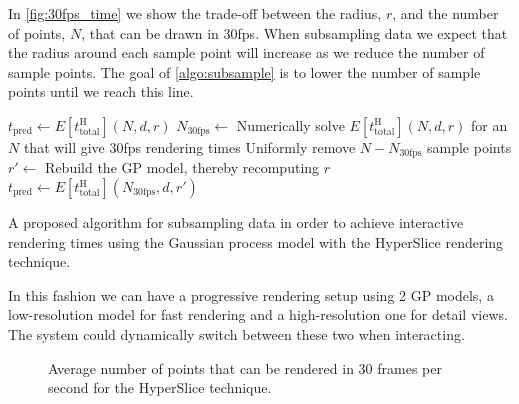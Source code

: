 In \autoref{fig:30fps_time} we show the trade-off between the radius, $r$, and the
number of points, $N$, that can be drawn in 30fps.  When subsampling data we
expect that the radius around each sample point will increase as we reduce
the number of sample points.  The goal of \autoref{algo:subsample} is to 
lower the number of sample points until we reach this line.

\begin{algorithm}

  \begin{algorithmic}
    \State $t_\text{pred} \gets E[t_\text{total}^\text{H}](N, d, r)$\;
      \State $N_\text{30fps} \gets$ Numerically solve $E[t_\text{total}^\text{H}](N, d, r)$ for an $N$ that will give 30fps rendering times\;
      \State Uniformly remove $N - N_\text{30fps}$ sample points\;
      \State $r' \gets$ Rebuild the GP model, thereby recomputing $r$\;
      \State $t_\text{pred} \gets E[t_\text{total}^\text{H}](N_\text{30fps}, d, r')$\;
    \EndWhile
  \end{algorithmic}
  \caption{A proposed algorithm for subsampling data in order to achieve
           interactive rendering times using the Gaussian process model
           with the HyperSlice rendering technique.  \label{algo:subsample}}
\end{algorithm}

In this fashion we can have a progressive rendering setup using 2 GP models, 
a low-resolution model for fast rendering and a high-resolution one for
detail views.  The system could dynamically switch between these two when
interacting.

\begin{figure}[h]
  \centering
  
  \caption{
    Average number of points that can be rendered in 30 frames per 
    second for the HyperSlice technique.
  }
  \label{fig:30fps_time}
\end{figure}

